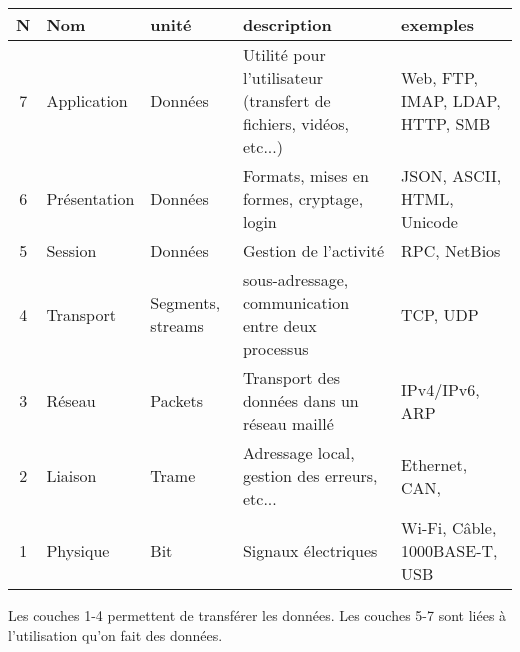 \documentclass[resume]{subfiles}
\begin{document}
\begin{table}[H]
\centering
\begin{tabular}{cll m{5cm} m{5cm}}
N & Nom & unité & description & exemples\\\hline\hline
7 & Application & Données & Utilité pour l'utilisateur (transfert de fichiers, vidéos, etc...) & Web, FTP, IMAP, LDAP, HTTP, SMB\\\hline
6 & Présentation & Données & Formats, mises en formes, cryptage, login & JSON, ASCII, HTML, Unicode\\\hline
5 & Session & Données & Gestion de l'activité & RPC, NetBios\\\hline
4 & Transport & Segments, streams & sous-adressage, communication entre deux processus & TCP, UDP\\\hline
3 & Réseau & Packets & Transport des données dans un réseau maillé & IPv4/IPv6, ARP\\\hline
2 & Liaison & Trame & Adressage local, gestion des erreurs, etc... & Ethernet, CAN, \\\hline
1 & Physique & Bit & Signaux électriques & Wi-Fi, Câble, 1000BASE-T, USB
\end{tabular}
\end{table}
Les couches 1-4 permettent de transférer les données. Les couches 5-7 sont liées à l'utilisation qu'on fait des données.
\end{document}
